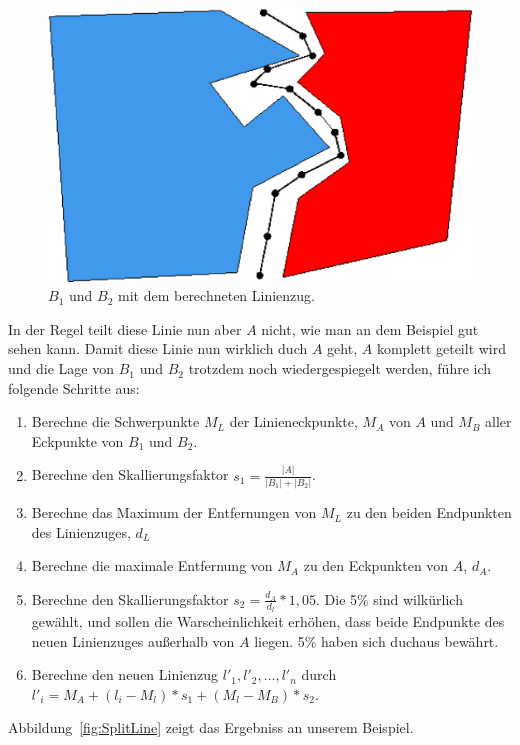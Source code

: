 \begin{figure}
	\centering
	\includegraphics[scale=0.6]{MittelpunktLinie.eps}
	\caption{$B_1$ und $B_2$ mit dem berechneten Linienzug.}
	\label{fig:MittelpunktLinie}
\end{figure}

In der Regel teilt diese Linie  nun aber $A$ nicht, wie man an dem Beispiel gut sehen kann. Damit diese Linie nun wirklich duch $A$ geht, $A$ komplett geteilt wird und die Lage von $B_1$ und $B_2$ trotzdem noch wiedergespiegelt werden, führe ich folgende Schritte aus:

\begin{enumerate}
\item Berechne die Schwerpunkte $M_L$ der Linieneckpunkte, $M_A$ von $A$ und $M_B$ aller Eckpunkte von $B_1$ und $B_2$.
\item Berechne den Skallierungsfaktor $s_1=\frac{|A|}{|B_1|+|B_2|}$. 
\item Berechne das Maximum der Entfernungen von $M_L$ zu den beiden Endpunkten des Linienzuges, $d_L$ 
\item Berechne die maximale Entfernung von $M_A$ zu den Eckpunkten von $A$, $d_A$.
\item Berechne den Skallierungsfaktor $s_2=\frac{d_A}{d_l} * 1,05$. Die 5\% sind wilkürlich gewählt, und sollen die Warscheinlichkeit erhöhen, dass beide Endpunkte des neuen Linienzuges außerhalb von $A$ liegen. 5\% haben sich duchaus bewährt.
\item Berechne den neuen Linienzug $l'_1,l'_2,\hdots ,l'_n$ durch $l'_i=M_A+(l_i-M_l)*s_1+(M_l-M_B)*s_2$.
\end{enumerate}


Abbildung~\ref{fig:SplitLine} zeigt das Ergebniss an unserem Beispiel. 


